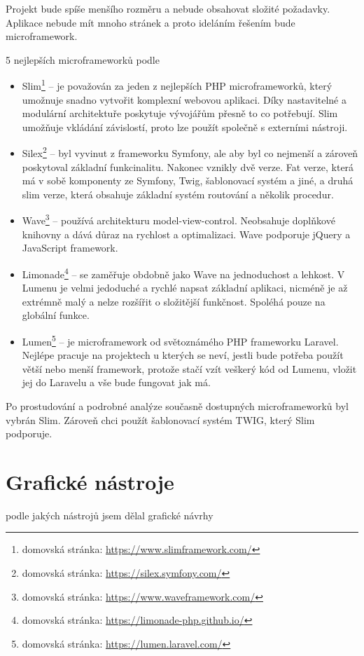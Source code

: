             Projekt bude spíše menšího rozměru a nebude obsahovat složité požadavky. Aplikace nebude mít mnoho stránek a proto ideláním řešením bude microframework.
            
            5 nejlepších microframeworků podle \cite{microframeworks}
            
            \begin{itemize}
                \item Slim\footnote{domovská stránka: \url{https://www.slimframework.com/}} – je považován za jeden z nejlepších PHP microframeworků, který umožnuje snadno vytvořit komplexní webovou aplikaci. Díky nastavitelné a modulární architektuře poskytuje vývojářům přesně to co potřebují. Slim umožňuje vkládání závislostí, proto lze použít společně s externími nástroji.
                \item Silex\footnote{domovská stránka: \url{https://silex.symfony.com/}} – byl vyvinut z frameworku Symfony, ale aby byl co nejmenší a zároveň poskytoval základní funkcinalitu. Nakonec vznikly dvě verze. Fat verze, která má v sobě komponenty ze Symfony, Twig, šablonovací systém a jiné, a druhá slim verze, která obsahuje základní systém routování a několik procedur. 
                \item Wave\footnote{domovská stránka: \url{https://www.waveframework.com/}} – používá architekturu model-view-control. Neobsahuje doplňkové knihovny a dává důraz na rychlost a optimalizaci. Wave podporuje jQuery a JavaScript framework.
                \item Limonade\footnote{domovská stránka: \url{https://limonade-php.github.io/}} – se zaměřuje obdobně jako Wave na jednoduchost a lehkost. V Lumenu je velmi jedoduché a rychlé napsat základní aplikaci, nicméně je až extrémně malý a nelze rozšířit o složitější funkčnost. Spoléhá pouze na globální funkce.
                \item Lumen\footnote{domovská stránka: \url{https://lumen.laravel.com/}} – je microframework od světoznámého PHP frameworku Laravel. Nejlépe pracuje na projektech u kterých se neví, jestli bude potřeba použít větší nebo menší framework, protože stačí vzít veškerý kód od Lumenu, vložit jej do Laravelu a vše bude fungovat jak má.
            \end{itemize}
        
        Po prostudování a podrobné analýze současně dostupných microframeworků byl vybrán Slim. Zároveň chci použít šablonovací systém TWIG, který Slim podporuje.
        
    \section{Grafické nástroje}
        podle jakých nástrojů jsem dělal grafické návrhy
